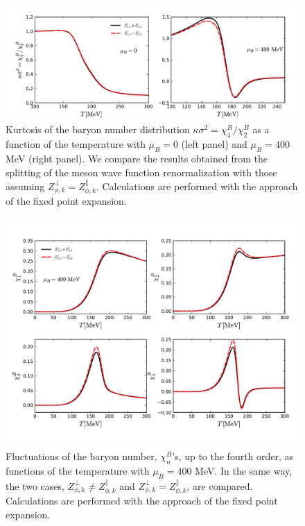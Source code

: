 \documentclass[%
reprint,
superscriptaddress,
showpacs,preprintnumbers,
 amsmath,amssymb,
 aps,
prd,
]{revtex4-1}
\begin{document}
%
\begin{figure}[t]
\includegraphics[width=1\textwidth]{kurtosis}
\caption{Kurtosis of the baryon number distribution $\kappa \sigma^2=\chi_4^{B}/\chi_2^{B}$ as a function of the temperature with $\mu_B=0$ (left panel) and $\mu_B=400$ MeV (right panel).  We compare the results obtained from the splitting of the meson wave function renormalization with those assuming $Z_{\phi,k}^{\perp}=Z_{\phi,k}^{\parallel}$. Calculations are performed with the approach of the fixed point expansion.}\label{fig:kurtosis}
\end{figure}
%

%
\begin{figure}[t]
\includegraphics[width=1\textwidth]{chi}
\caption{Fluctuations of the baryon number, $\chi_n^B$'s, up to the fourth order, as functions of the temperature with  $\mu_B=400$ MeV. In the same way, the two cases, $Z_{\phi,k}^{\perp}\ne Z_{\phi,k}^{\parallel}$ and $Z_{\phi,k}^{\perp}=Z_{\phi,k}^{\parallel}$, are compared. Calculations are performed with the approach of the fixed point expansion.}\label{fig:chi}
\end{figure}
%
\end{document}
